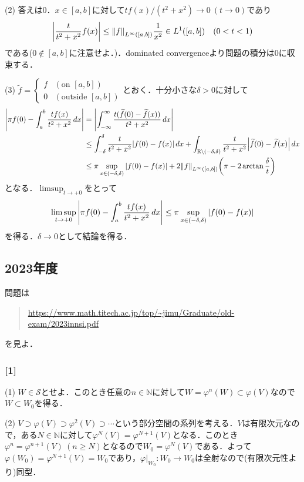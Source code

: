 \documentclass[a4j]{ltjsarticle}
\newcommand{\Rset}{\mathbb{R}}
\newcommand{\Nset}{\mathbb{N}}
\newcommand{\1}{\mathbbm{1}}
\numberwithin{equation}{section}
\theoremstyle{definition}
\begin{document}
(2) 答えは0．$x\in[a,b]$に対して$tf(x)/(t^2+x^2)\to0\ (t\to0)$であり
\begin{equation}
    \abs{\frac{t}{t^2+x^2}f(x)}\leq \norm{f}_{L^\infty([a,b])}\frac{1}{x^2} \in L^1([a,b])\quad (0<t<1) 
\end{equation}
である($0\notin [a,b]$に注意せよ．)．dominated convergenceより問題の積分は0に収束する．

(3) $\widetilde{f}=\begin{cases}
    f & (\text{on $[a,b]$})\\
    0 & (\text{outside $[a,b]$})
\end{cases}$とおく．十分小さな$\delta>0$に対して
\begin{align}
    \abs{\pi f(0)-\int_{a}^b \frac{tf(x)}{t^2+x^2}\,dx}
    &=\abs{\int_{-\infty}^{\infty}\frac{t(\widetilde{f}(0)-\widetilde{f}(x))}{t^2+x^2}\,dx}\\
    &\leq \int_{-\delta}^{\delta}\frac{t}{t^2+x^2}\abs{f(0)-f(x)}\,dx + \int_{\Rset\setminus(-\delta,\delta)}\frac{t}{t^2+x^2}\abs{\widetilde{f}(0)-\widetilde{f}(x)}\,dx\\
    &\leq \pi\sup_{x\in (-\delta,\delta)}\abs{f(0)-f(x)}+2\norm{f}_{L^\infty([a,b])}\qty(\pi-2\arctan\frac{\delta}{t})
\end{align}
となる．$\limsup_{t\to+0}$をとって
\begin{equation}
    \limsup_{t\to +0}\abs{\pi f(0)-\int_{a}^b \frac{tf(x)}{t^2+x^2}\,dx}\leq \pi\sup_{x\in(-\delta,\delta)}\abs{f(0)-f(x)}
\end{equation}
を得る．$\delta\to0$として結論を得る．
\subsection{2023年度}
問題は
\begin{quote}
    \url{https://www.math.titech.ac.jp/top/~jimu/Graduate/old-exam/2023innsi.pdf}
\end{quote}
を見よ．
\subsubsection*{[1]}
(1) $W\in \mathcal{S}$とせよ．このとき任意の$n\in\Nset$に対して$W=\varphi^n(W)\subset \varphi(V)$なので$W\subset W_0$を得る．

(2) $V\supset \varphi(V)\supset \varphi^2(V)\supset\cdots$という部分空間の系列を考える．$V$は有限次元なので，ある$N\in\Nset$に対して$\varphi^N(V)=\varphi^{N+1}(V)$となる．このとき$\varphi^{n}=\varphi^{n+1}(V)\ (n\geq N)$となるので$W_0=\varphi^N(V)$である．よって$\varphi(W_0)=\varphi^{N+1}(V)=W_0$であり，$\varphi|_{W_0}\colon W_0\to W_0$は全射なので(有限次元性より)同型．
\end{document}
